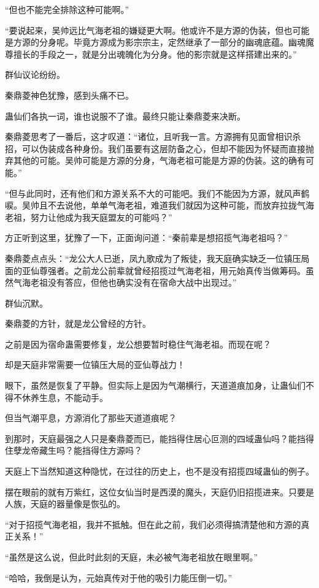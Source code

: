 \begin{this_body}
“但也不能完全排除这种可能啊。”

“要说起来，吴帅远比气海老祖的嫌疑更大啊。他或许不是方源的伪装，但也可能是方源的分身呢。毕竟方源成为影宗宗主，定然继承了一部分的幽魂底蕴。幽魂魔尊擅长的手段之一，就是分出魂魄化为分身。他的影宗就是这样搭建出来的。”

群仙议论纷纷。

秦鼎菱神色犹豫，感到头痛不已。

蛊仙们各执一词，谁也说服不了谁。最终只能让秦鼎菱来决断。

秦鼎菱思考了一番后，这才叹道：“诸位，且听我一言。方源拥有见面曾相识杀招，可以伪装成各种身份。我们虽要有这层防备之心，但却不能因为怀疑而直接抛弃其他的可能。吴帅可能是方源的分身，气海老祖可能是方源的伪装。这的确有可能。”

“但与此同时，还有他们和方源关系不大的可能吧。我们不能因为方源，就风声鹤唳。吴帅且不去说他，单单气海老祖，难道我们就因为这种可能，而放弃拉拢气海老祖，努力让他成为我天庭盟友的可能吗？”

方正听到这里，犹豫了一下，正面询问道：“秦前辈是想招揽气海老祖吗？”

秦鼎菱点点头：“龙公大人已逝，凤九歌成为了叛徒，我天庭确实缺乏一位镇压局面的亚仙尊强者。之前龙公前辈就曾经招揽过气海老祖，用元始真传当做筹码。虽然气海老祖没有答应，但他也确实没有在宿命大战中出现过。”

群仙沉默。

秦鼎菱的方针，就是龙公曾经的方针。

之前是因为宿命蛊需要修复，龙公想要暂时稳住气海老祖。而现在呢？

却是天庭非常需要一位镇压大局的亚仙尊战力！

眼下，虽然是恢复了平静。但实际上是因为气潮横行，天道道痕加身，让蛊仙们不得不休养生息，不能动手。

但当气潮平息，方源消化了那些天道道痕呢？

到那时，天庭最强之人只是秦鼎菱而已，能挡得住居心叵测的四域蛊仙吗？能挡得住孽龙帝藏生吗？能挡得住方源吗？

天庭上下当然知道这种隐忧，在过往的历史上，也不是没有招揽四域蛊仙的例子。

摆在眼前的就有万紫红，这位女仙当时是西漠的魔头，天庭仍旧招揽进来。只要是人族，天庭的器量像是恢弘的。

“对于招揽气海老祖，我并不抵触。但在此之前，我们必须得搞清楚他和方源的真正关系！”

“虽然是这么说，但此时此刻的天庭，未必被气海老祖放在眼里啊。”

“哈哈，我倒是认为，元始真传对于他的吸引力能压倒一切。”


\end{this_body}
